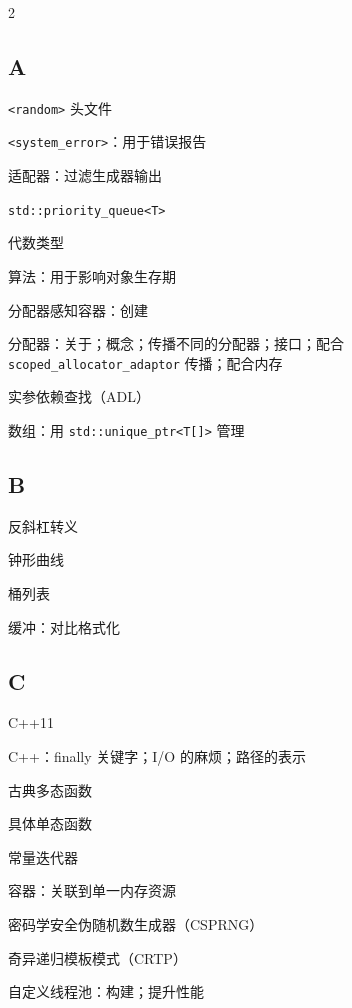 \begin{multicols}{2}

\subsection*{A}

\noindent \texttt{<random>\allowbreak{}} 头文件\par
\noindent \texttt{<system\_\allowbreak{}error>\allowbreak{}}：用于错误报告\par
\noindent 适配器：过滤生成器输出\par
\noindent \texttt{std::\allowbreak{}priority\_\allowbreak{}queue<\allowbreak{}T>\allowbreak{}}\par
\noindent 代数类型\par
\noindent 算法：用于影响对象生存期\par
\noindent 分配器感知容器：创建\par
\noindent 分配器：关于；概念；传播不同的分配器；接口；配合 \texttt{scoped\_\allowbreak{}allocator\_\allowbreak{}adaptor} 传播；配合内存\par
\noindent 实参依赖查找（ADL）\par
\noindent 数组：用 \texttt{std::\allowbreak{}unique\_\allowbreak{}ptr<\allowbreak{}T[]>} 管理\par

\subsection*{B}

\noindent 反斜杠转义\par
\noindent 钟形曲线\par
\noindent 桶列表\par
\noindent 缓冲：对比格式化\par

\subsection*{C}

\noindent C++11\par
\noindent C++：finally 关键字；I/O 的麻烦；路径的表示\par
\noindent 古典多态函数\par
\noindent 具体单态函数\par
\noindent 常量迭代器\par
\noindent 容器：关联到单一内存资源\par
\noindent 密码学安全伪随机数生成器（CSPRNG）\par
\noindent 奇异递归模板模式（CRTP）\par
\noindent 自定义线程池：构建；提升性能\par


\end{multicols}
